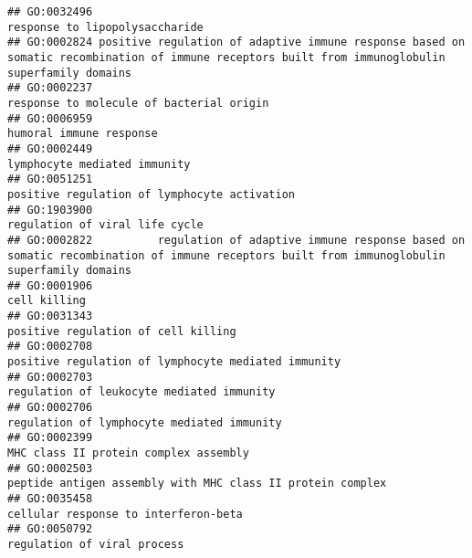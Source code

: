\documentclass[
]{article}
\begin{document}
\begin{verbatim}
## GO:0032496                                                                                                                   response to lipopolysaccharide
## GO:0002824 positive regulation of adaptive immune response based on somatic recombination of immune receptors built from immunoglobulin superfamily domains
## GO:0002237                                                                                                         response to molecule of bacterial origin
## GO:0006959                                                                                                                          humoral immune response
## GO:0002449                                                                                                                     lymphocyte mediated immunity
## GO:0051251                                                                                                     positive regulation of lymphocyte activation
## GO:1903900                                                                                                                   regulation of viral life cycle
## GO:0002822          regulation of adaptive immune response based on somatic recombination of immune receptors built from immunoglobulin superfamily domains
## GO:0001906                                                                                                                                     cell killing
## GO:0031343                                                                                                              positive regulation of cell killing
## GO:0002708                                                                                              positive regulation of lymphocyte mediated immunity
## GO:0002703                                                                                                        regulation of leukocyte mediated immunity
## GO:0002706                                                                                                       regulation of lymphocyte mediated immunity
## GO:0002399                                                                                                            MHC class II protein complex assembly
## GO:0002503                                                                                       peptide antigen assembly with MHC class II protein complex
## GO:0035458                                                                                                             cellular response to interferon-beta
## GO:0050792                                                                                                                      regulation of viral process

\end{verbatim}
\end{document}
